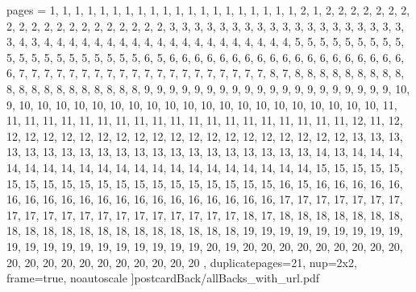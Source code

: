 \documentclass[letterpaper]{article}
\begin{document}

	pages = 	{ %
											1,	1,	1,	1,	1,	1,	1,	1,	1,	1,	1,	1,	1,	1,	1,	1,	1,	1,	1,	1,
											2,	1,	
											2,	2,	2,	2,	2,	2,	2,	2,	2,	2,	2,	2,	2,	2,	2,	2,	2,	2,	2,	2,
											3,	3,	3,	3,	3,	3,	3,	3,	3,	3,	3,	3,	3,	3,	3,	3,	3,	3,	3,	3,
											4,	3,	
											4,	4,	4,	4,	4,	4,	4,	4,	4,	4,	4,	4,	4,	4,	4,	4,	4,	4,	4,	4,
											5,	5,	5,	5,	5,	5,	5,	5,	5,	5,	5,	5,	5,	5,	5,	5,	5,	5,	5,	5,
											6,	5,
											6,	6,	6,	6,	6,	6,	6,	6,	6,	6,	6,	6,	6,	6,	6,	6,	6,	6,	6,	6,
											7,	7,	7,	7,	7,	7,	7,	7,	7,	7,	7,	7,	7,	7,	7,	7,	7,	7,	7,	7,
											8,	7,	
											8,	8,	8,	8,	8,	8,	8,	8,	8,	8,	8,	8,	8,	8,	8,	8,	8,	8,	8,	8,
											9,	9,	9,	9,	9,	9,	9,	9,	9,	9,	9,	9,	9,	9,	9,	9,	9,	9,	9,	9,
											10, 9,
											10,	10,	10,	10,	10,	10,	10,	10,	10,	10,	10,	10,	10,	10,	10,	10,	10,	10,	10,	10,
											11,	11,	11,	11,	11,	11,	11,	11,	11,	11,	11,	11,	11,	11,	11,	11,	11,	11,	11,	11,
											12,	11,
											12,	12,	12,	12,	12,	12,	12,	12,	12,	12,	12,	12,	12,	12,	12,	12,	12,	12,	12,	12,
											13,	13,	13,	13,	13,	13,	13,	13,	13,	13,	13,	13,	13,	13,	13,	13,	13,	13,	13,	13,
											14, 	13,
											14,	14,	14,	14,	14,	14,	14,	14,	14,	14,	14,	14,	14,	14,	14,	14,	14,	14,	14,	14,
											15,	15,	15,	15,	15,	15,	15,	15,	15,	15,	15,	15,	15,	15,	15,	15,	15,	15,	15,	15,
											16,	15,
											16,	16,	16,	16,	16,	16,	16,	16,	16,	16,	16,	16,	16,	16,	16,	16,	16,	16,	16,	16,
											17,	17,	17,	17,	17,	17,	17,	17,	17,	17,	17,	17,	17,	17,	17,	17,	17,	17,	17,	17,
											18,	17,
											18,	18,	18,	18,	18,	18,	18,	18,	18,	18,	18,	18,	18,	18,	18,	18,	18,	18,	18,	18,
											19,	19,	19,	19,	19,	19,	19,	19,	19,	19,	19,	19,	19,	19,	19,	19,	19,	19,	19,	19,
											20,	19,
											20,	20,	20,	20,	20,	20,	20,	20,	20,	20,	20,	20,	20,	20,	20,	20,	20,	20,	20,	20
										},
						duplicatepages=21,
						nup=2x2,
						frame=true,
						noautoscale
					]{postcardBack/allBacks_with_url.pdf}
\end{document}
